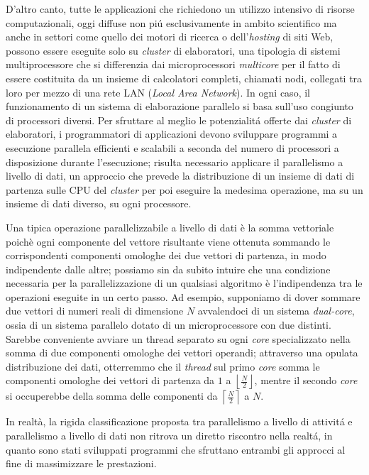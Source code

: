 D'altro canto, tutte le applicazioni che richiedono un utilizzo intensivo di risorse computazionali, oggi diffuse non pi\'u esclusivamente in ambito
scientifico ma anche in settori come quello dei motori di ricerca o dell'\textit{hosting} di siti Web, possono essere eseguite solo su \textit{cluster} di elaboratori, una tipologia di sistemi multiprocessore che si differenzia dai microprocessori \textit{multicore} per il fatto di essere costituita da un insieme di calcolatori completi, chiamati nodi, collegati tra loro per mezzo di una rete LAN (\textit{Local Area Network}).\newline
In ogni caso, il funzionamento di un sistema di elaborazione parallelo si basa sull'uso congiunto di processori diversi.\newline
Per sfruttare al meglio le potenzialit\'a offerte dai \textit{cluster} di elaboratori, i programmatori di applicazioni devono sviluppare programmi a esecuzione parallela efficienti e scalabili a seconda del numero di processori a disposizione durante l'esecuzione; risulta necessario applicare il parallelismo a livello di dati, un approccio che prevede la distribuzione di un insieme di dati di partenza sulle CPU del \textit{cluster} per poi eseguire la medesima operazione, ma su un insieme di dati diverso, su ogni processore.

Una tipica operazione parallelizzabile a livello di dati è la somma vettoriale poichè ogni componente del vettore risultante viene ottenuta
sommando le corrispondenti componenti omologhe dei due vettori di partenza, in modo indipendente dalle altre; possiamo sin da subito intuire che una condizione necessaria per la parallelizzazione di un qualsiasi algoritmo è l'indipendenza tra le operazioni eseguite in un certo passo.
Ad esempio, supponiamo di dover sommare due vettori di numeri reali di dimensione $N$ avvalendoci di un sistema \textit{dual-core}, ossia di un sistema parallelo dotato di un microprocessore con
due  distinti. Sarebbe conveniente avviare un thread separato su ogni \textit{core} specializzato nella somma di due componenti omologhe dei vettori operandi; attraverso una opulata distribuzione dei dati, otterremmo che il \textit{thread} sul primo \textit{core} somma le componenti omologhe dei vettori di partenza
da $1$ a $\left\lfloor\frac{N}{2}\right\rfloor$, mentre il secondo \textit{core} si occuperebbe della somma delle componenti da $\left\lceil\frac{N}{2}\right\rceil$ a $N$.

In realtà, la rigida classificazione proposta tra parallelismo a livello di attivit\'a e parallelismo a livello di dati non ritrova un diretto
riscontro nella realt\'a, in quanto sono stati sviluppati programmi che sfruttano entrambi gli approcci al fine di massimizzare le prestazioni.

